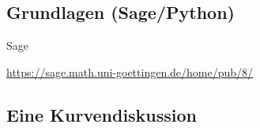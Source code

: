 \documentclass[hyperref={xetex}]{beamer}
\begin{document}







\subsection{Grundlagen (Sage/Python)}
\begin{frame}[fragile]{Sage}
\begin{center}
\url{https://sage.math.uni-goettingen.de/home/pub/8/}
\end{center}
\end{frame}

\subsection{Eine Kurvendiskussion}
\end{document}
